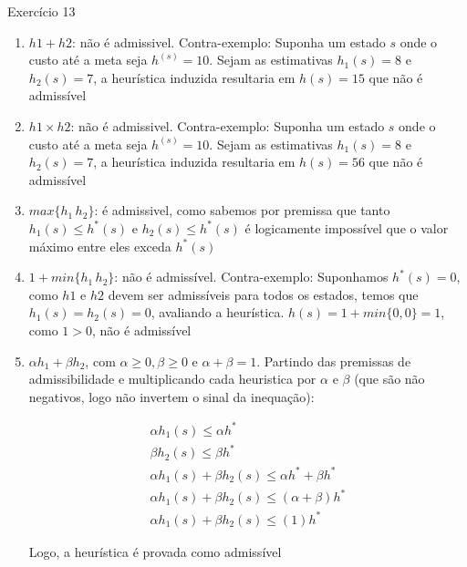 \documentclass[a4paper,11pt]{article}
\theoremstyle{definition}
\theoremstyle{plain}
\theoremstyle{remark}
\newcounter{questao}[section]
\begin{document}
\begin{questaoManually}{Exercício 13}
  \begin{enumerate}[label=\alph*.]
    \item $h1 + h2$: não é admissivel. Contra-exemplo: Suponha um estado $s$ onde o custo até a meta seja $h^(s) = 10$. Sejam as estimativas $h_1(s) = 8$ e $h_2(s) = 7$, a heurística induzida resultaria em $h(s) = 15$ que não é admissível
    \item $h1 \times h2$: não é admissivel. Contra-exemplo: Suponha um estado $s$ onde o custo até a meta seja $h^(s) = 10$. Sejam as estimativas $h_1(s) = 8$ e $h_2(s) = 7$, a heurística induzida resultaria em $h(s) = 56$ que não é admissível
    \item $max\{h_1\,h_2\}$: é admissivel, como sabemos por premissa que tanto $h_1(s) \leq h^*(s)$ e $h_2(s) \leq h^*(s)$ é logicamente impossível que o valor máximo entre eles exceda $h^*(s)$
    \item $1 + min\{h_1\,h_2\}$: não é admissível. Contra-exemplo: Suponhamos $h^*(s) = 0$, como $h1$ e $h2$ devem ser admissíveis para todos os estados, temos que $h_1(s) = h_2(s) = 0$, avaliando a heurística. $h(s) = 1 + min\{0,0\} = 1$, como $ 1 > 0 $, não é admissível
    \item $\alpha h_1 + \beta h_2$, com $\alpha \geq 0, \beta \geq 0$ e $\alpha+\beta = 1$. Partindo das premissas de admissibilidade e multiplicando cada heuristica por $\alpha$ e $\beta$ (que são não negativos, logo não invertem o sinal da inequação):
    
    \begin{align}
      \alpha h_1(s) \leq \alpha h^* \\
      \beta h_2(s) \leq \beta h^* \\
      \alpha h_1(s) + \beta h_2(s) \leq \alpha h^* + \beta h^* \\
      \alpha h_1(s) + \beta h_2(s) \leq (\alpha + \beta) h^* \\
      \alpha h_1(s) + \beta h_2(s) \leq (1) h^*
    \end{align}
    
    Logo, a heurística é provada como admissível
  \end{enumerate}
\end{questaoManually}
\end{document}
